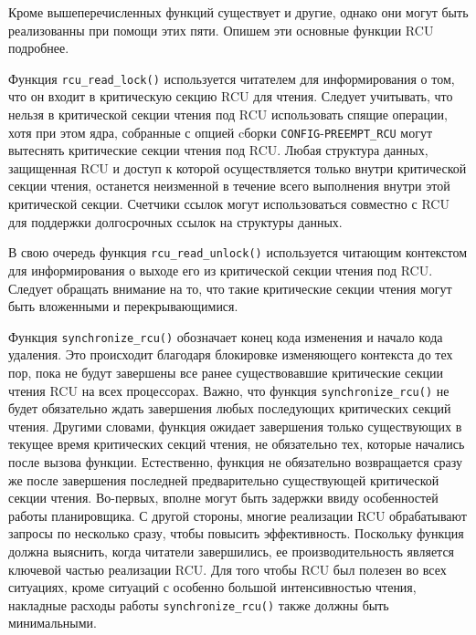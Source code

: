 Кроме вышеперечисленных функций существует и другие, однако они могут быть
реализованны при помощи этих пяти. Опишем эти основные функции RCU подробнее.

Функция \texttt{rcu\_read\_lock()} используется читателем для информирования о
том, что он входит в критическую секцию RCU для чтения. Следует учитывать, что
нельзя в критической секции чтения под RCU использовать спящие операции, хотя
при этом ядра, собранные с опцией cборки \texttt{CONFIG}-\texttt{PREEMPT\_RCU} могут вытеснять
критические секции чтения под RCU. Любая структура данных, защищенная RCU и
доступ к которой осуществляется только внутри критической секции чтения,
останется неизменной в течение всего выполнения внутри этой критической секции.
Счетчики ссылок могут использоваться совместно с RCU для поддержки долгосрочных
ссылок на структуры данных.

В свою очередь функция \texttt{rcu\_read\_unlock()} используется читающим
контекстом для информирования о выходе его из критической секции чтения под RCU.
Следует обращать внимание на то, что такие критические секции чтения могут быть
вложенными и перекрывающимися.

Функция \texttt{synchronize\_rcu()} обозначает конец кода изменения и начало
кода удаления. Это происходит благодаря блокировке изменяющего контекста до тех
пор, пока не будут завершены все ранее существовавшие критические секции чтения
RCU на всех процессорах. Важно, что функция \texttt{synchronize\_rcu()} не будет
обязательно ждать завершения любых последующих критических секций чтения.
Другими словами, функция ожидает завершения только существующих в текущее время
критических секций чтения, не обязательно тех, которые начались после вызова
функции. Естественно, функция не обязательно возвращается сразу же после
завершения последней предварительно существующей критической секции чтения.
Во-первых, вполне могут быть задержки ввиду особенностей работы планировщика. С
другой стороны, многие реализации RCU обрабатывают запросы по несколько сразу,
чтобы повысить эффективность. Поскольку функция должна выяснить, когда читатели
завершились, ее производительность является ключевой частью реализации RCU. Для
того чтобы RCU был полезен во всех ситуациях, кроме ситуаций с особенно большой
интенсивностью чтения, накладные расходы работы \texttt{synchronize\_rcu()}
также должны быть минимальными.

